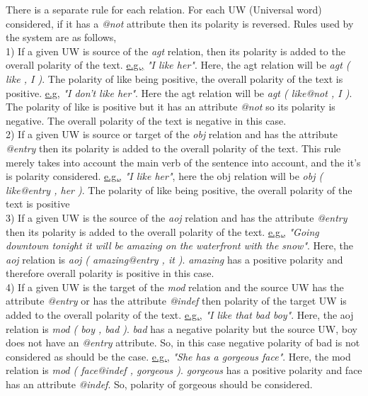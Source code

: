 There is a separate rule for each relation. For each UW (Universal word) considered, if it has a \textit{@not} attribute then its polarity is reversed. Rules used by the system
are as follows,\\
1) If a given UW is source of the \textit{agt} relation, then its polarity is added to the overall polarity of the text.
\underline{e.g.,} \textit{"I like her"}. Here, the agt relation will be \textit{agt ( like , I )}. The polarity of like being positive, the overall polarity of the text is positive.
\underline{e.g,} \textit{"I don't like her"}. Here the agt relation will be \textit{agt ( like@not , I )}. The polarity of like is positive but it has an attribute \textit{@not}
so its polarity is negative. The overall polarity of the text is negative in this case. \\
2) If a given UW is source or target of the \textit{obj} relation and has the attribute \textit{@entry} then its polarity is added to the overall polarity of the text. This rule 
merely takes into account the main verb of the sentence into account, and the it's is polarity considered.
\underline{e.g.,} \textit{"I like her"}, here the obj relation will be \textit{obj ( like@entry , her )}. The polarity of like being positive, the overall polarity of the text is positive \\
3) If a given UW is the source of the \textit{aoj} relation and has the attribute \textit{@entry} then its polarity is added to the overall polarity of the text.
\underline{e.g.,} \textit{"Going downtown tonight it will be amazing on the waterfront with the snow"}. Here, the \textit{aoj} relation is \textit{aoj ( amazing@entry , it )}. 
\textit{amazing} has a positive polarity and therefore overall polarity is positive in this case.\\
4) If a given UW is the target of the \textit{mod} relation and the source UW has the attribute \textit{@entry} or has the attribute \textit{@indef} then polarity of the 
target UW is added to the overall polarity of the text.
\underline{e.g.,} \textit{"I like that bad boy"}. Here, the aoj relation is \textit{mod ( boy , bad )}. \textit{bad} has a negative polarity but the source UW, boy does not have an 
\textit{@entry} attribute. So, in this case negative polarity of bad is not considered as should be the case.
\underline{e.g.,} \textit{"She has a gorgeous face"}. Here, the mod relation is \textit{mod ( face@indef , gorgeous )}. \textit{gorgeous} has a positive polarity and face has an 
attribute \textit{@indef}. So, polarity of gorgeous should be considered. \\
